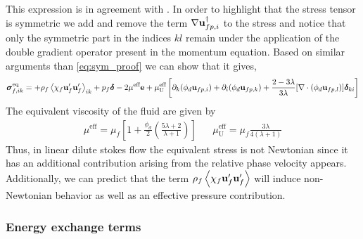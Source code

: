 This expression is in agreement with \citet[Appendix A]{zhang1997momentum}. 
In order to highlight that the stress tensor is symmetric we add and remove the term $ \mathbf{\nabla} \textbf{u}_{fp,i}^\dagger$  to the stress and notice that only the symmetric part in the indices $kl$ remain under the application of the double gradient operator present in the momentum equation. 
Based on similar arguments than \ref{eq:sym_proof} we can show that it gives, 
\begin{align}
    \bm{\sigma}^\text{eq}_{f,ik} =
    + \rho_f\left<\chi_f\textbf{u}_f'\textbf{u}_f'\right>_{ik} 
    + p_f \bm\delta
    - 2\mu^\text{eff} \textbf{e}
    + 
    \mu_\text{U}^\text{eff}
    \left[
        \partial_k   (\phi_d\textbf{u}_{fp,i})
        + \partial_i (\phi_d\textbf{u}_{fp,k})
        + \frac{2-3\lambda}{3\lambda}  [\mathbf{\nabla}\cdot (\phi_d\textbf{u}_{fp,l})]\bm\delta_{ki}
    \right]
    \label{eq:fluid_phase_stress}
\end{align} 
The equivalent viscosity of the fluid are given by 
\begin{align*}
    \mu^\text{eff} = \mu_f \left[
        1
        +\frac{\phi_d}{2}\left(
            \frac{5\lambda +2}{\lambda +1}
        \right)
    \right] &&
    \mu^\text{eff}_\text{U}
    = \mu_f\frac{ 3\lambda}{4(\lambda +1) }
\end{align*}
Thus, in linear dilute stokes flow the equivalent stress is not Newtonian since it has an additional contribution arising from the relative phase velocity appears. 
Additionally, we can predict that the term $\rho_f\left<\chi_f\textbf{u}_f'\textbf{u}_f'\right>$ will induce non-Newtonian behavior as well as an effective pressure contribution. 

\subsubsection{Energy exchange terms}


